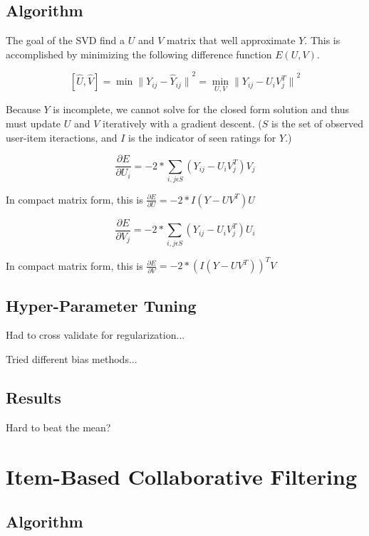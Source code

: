 \documentclass[12pt]{article}
\begin{document}
\subsection{Algorithm}
The goal of the SVD find a $U$ and $V$ matrix that well approximate $Y$. This is accomplished by minimizing the following difference function $E(U,V)$.

$$ [\hat{U}, \hat{V}] = \min{\|Y_{ij} - \hat{Y}_{ij}\|}^2 = \min\limits_{U,V}{\|Y_{ij} - U_i V_j^T\|}^2$$

Because $Y$ is incomplete, we cannot solve for the closed form solution and thus must update $U$ and $V$ iteratively with a gradient descent. ($S$ is the set of observed user-item iteractions, and $I$ is the indicator of seen ratings for $Y$.)

$$ \frac{\partial E}{\partial U_i} = -2 * \sum\limits_{i,j \epsilon S} (Y_{ij} - U_i V_j^T) V_j $$

\begin{center}
  In compact matrix form, this is $\frac{\partial E}{\partial U} = -2 * I (Y - U V^T)U $ 
\end{center}

$$ \frac{\partial E}{\partial V_j} = -2 * \sum\limits_{i,j \epsilon S} (Y_{ij} - U_i V_j^T) U_i $$

\begin{center}
  In compact matrix form, this is $\frac{\partial E}{\partial V} = -2 * (I (Y - U V^T))^T V $
\end{center}

\subsection{Hyper-Parameter Tuning}
Had to cross validate for regularization...

Tried different bias methods...

\subsection{Results}

Hard to beat the mean?

\section{Item-Based Collaborative Filtering}

\subsection{Algorithm}
\end{document}

